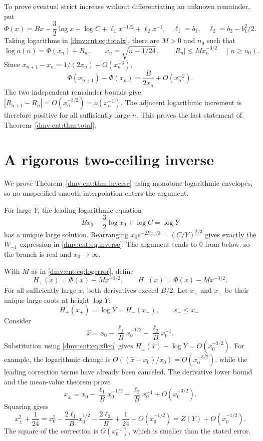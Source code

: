 \documentclass[11pt,letterpaper]{article}
\numberwithin{equation}{section}
\theoremstyle{definition}\newtheorem{definition}[theorem]{Definition}
\theoremstyle{remark}\newtheorem{remark}[theorem]{Remark}
\newcommand{\ee}{\mathrm e}
\begin{document}
To prove eventual strict increase without differentiating an unknown remainder, put
\begin{equation}\label{dmv:cnt:eq:Phi}
\Phi(x)=Bx-\frac32\log x+\log C+\ell_1x^{-1/2}+\ell_2x^{-1},
\quad \ell_1=b_1,\quad\ell_2=b_2-b_1^2/2.
\end{equation}
Taking logarithms in \eqref{dmv:cnt:eq:totalx}, there are $M>0$ and $n_0$ such that
\begin{equation}\label{dmv:cnt:eq:logerror}
\log a(n)=\Phi(x_n)+R_n,\qquad
x_n=\sqrt{n-1/24},\qquad |R_n|\le Mx_n^{-3/2}
\quad(n\ge n_0).
\end{equation}
Since $x_{n+1}-x_n=1/(2x_n)+O(x_n^{-3})$,
\[
\Phi(x_{n+1})-\Phi(x_n)=\frac B{2x_n}+O(x_n^{-2}).
\]
The two independent remainder bounds give $|R_{n+1}-R_n|=O(x_n^{-3/2})=o(x_n^{-1})$. The adjacent logarithmic increment is therefore positive for all sufficiently large $n$. This proves the last statement of Theorem~\ref{dmv:cnt:thm:total}.

\section{A rigorous two-ceiling inverse}\label{dmv:cnt:sec:inverse}
We prove Theorem~\ref{dmv:cnt:thm:inverse} using monotone logarithmic envelopes, so no unspecified smooth interpolation enters the argument.

For large $Y$, the leading logarithmic equation
\begin{equation}\label{dmv:cnt:eq:x0eq}
Bx_0-\frac32\log x_0+\log C=\log Y
\end{equation}
has a unique large solution. Rearranging $x_0\ee^{-2Bx_0/3}=(C/Y)^{2/3}$ gives exactly the $W_{-1}$ expression in \eqref{dmv:cnt:eq:inverse}. The argument tends to $0$ from below, so the branch is real and $x_0\to\infty$.

With $M$ as in \eqref{dmv:cnt:eq:logerror}, define
\begin{equation}\label{dmv:cnt:eq:envelopes}
H_+(x)=\Phi(x)+Mx^{-3/2},\qquad
H_-(x)=\Phi(x)-Mx^{-3/2}.
\end{equation}
For all sufficiently large $x$, both derivatives exceed $B/2$. Let $x_+$ and $x_-$ be their unique large roots at height $\log Y$:
\[
H_+(x_+)=\log Y=H_-(x_-),\qquad x_+\le x_-.
\]
Consider
\[
\widehat x=x_0-\frac{\ell_1}{B}x_0^{-1/2}-\frac{\ell_2}{B}x_0^{-1}.
\]
Substitution using \eqref{dmv:cnt:eq:x0eq} gives $H_\pm(\widehat x)-\log Y=O(x_0^{-3/2})$. For example, the logarithmic change is $O((\widehat x-x_0)/x_0)=O(x_0^{-3/2})$, while the leading correction terms have already been canceled. The derivative lower bound and the mean-value theorem prove
\begin{equation}\label{dmv:cnt:eq:rootexpand}
x_\pm=x_0-\frac{\ell_1}{B}x_0^{-1/2}-\frac{\ell_2}{B}x_0^{-1}
+O(x_0^{-3/2}).
\end{equation}
Squaring gives
\begin{equation}\label{dmv:cnt:eq:squareroots}
x_\pm^2+\frac1{24}
=x_0^2-\frac{2\ell_1}{B}x_0^{1/2}-\frac{2\ell_2}{B}+\frac1{24}
+O(x_0^{-1/2})=Z(Y)+O(x_0^{-1/2}).
\end{equation}
The square of the correction is $O(x_0^{-1})$, which is smaller than the stated error.
\end{document}
